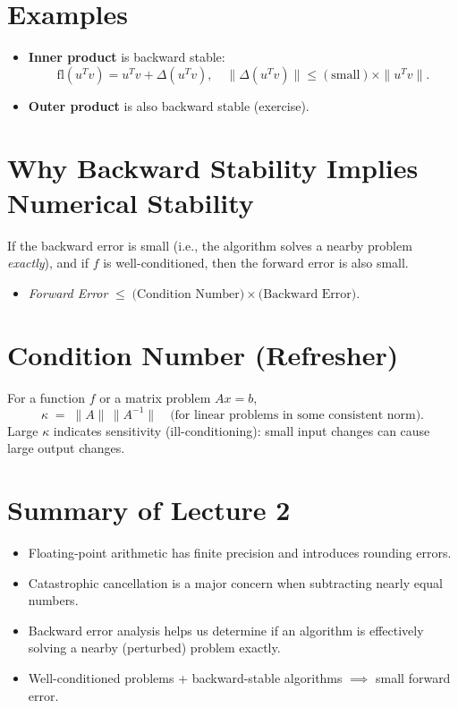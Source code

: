 \documentclass[12pt]{article}
\begin{document}
\section*{Examples}

\begin{itemize}
    \item \textbf{Inner product} is backward stable: 
    \[
      \mathrm{fl}(u^T v) = u^T v + \Delta (u^T v),
      \quad
      \|\Delta (u^T v)\| \le \mathrm{(small)} \times \|u^T v\|.
    \]
    \item \textbf{Outer product} is also backward stable (exercise).
\end{itemize}

\section*{Why Backward Stability Implies Numerical Stability}

If the backward error is small (i.e., the algorithm solves a nearby problem \emph{exactly}), and if $f$ is well-conditioned, then the forward error is also small. 

\begin{itemize}
    \item \emph{Forward Error} $\le \; \text{(Condition Number)} \times \text{(Backward Error)}.$
\end{itemize}

\section*{Condition Number (Refresher)}

For a function $f$ or a matrix problem $A x = b$,
\[
\kappa \;=\; \|A\| \,\|A^{-1}\|\quad
\text{(for linear problems in some consistent norm).}
\]
Large $\kappa$ indicates sensitivity (ill-conditioning): small input changes can cause large output changes.

\section*{Summary of Lecture 2}

\begin{itemize}
    \item Floating-point arithmetic has finite precision and introduces rounding errors.
    \item Catastrophic cancellation is a major concern when subtracting nearly equal numbers.
    \item Backward error analysis helps us determine if an algorithm is effectively solving a nearby (perturbed) problem exactly.
    \item Well-conditioned problems + backward-stable algorithms $\implies$ small forward error.
\end{itemize}
\end{document}
